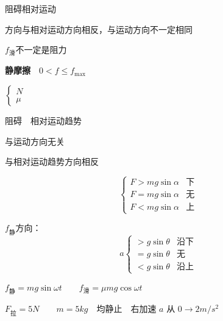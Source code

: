 阻碍相对运动

方向与相对运动方向相反，与运动方向不一定相同

$f_{\text{滑}}$不一定是阻力


\textbf{静摩擦}　$0<f\le f_{\max}$ %

$\left\{\begin{array}{l}N\\ \mu\end{array}\right.$

阻碍　相对运动趋势

与运动方向无关

与相对运动趋势方向相反


\[
\left\{\begin{array}{ll}
F>mg\sin\alpha & \text{下}\\
F=mg\sin\alpha & \text{无}\\
F<mg\sin\alpha & \text{上}
\end{array}\right.
\]

$f_{\text{静}}$方向：
\[
a\left\{\begin{array}{ll}
>g\sin\theta & \text{沿下}\\
=g\sin\theta & \text{无}\\
<g\sin\theta & \text{沿上}
\end{array}\right.
\]

$f_{\text{静}}=mg\sin\omega t$　　$f_{\text{滑}}=\mu mg\cos\omega t$


$F_{\text{拉}}=5\unit{N}$　　$m=5\unit{kg}$　均静止　右加速 $a$ 从 $0\to 2\unit{m/s^2}$ %

